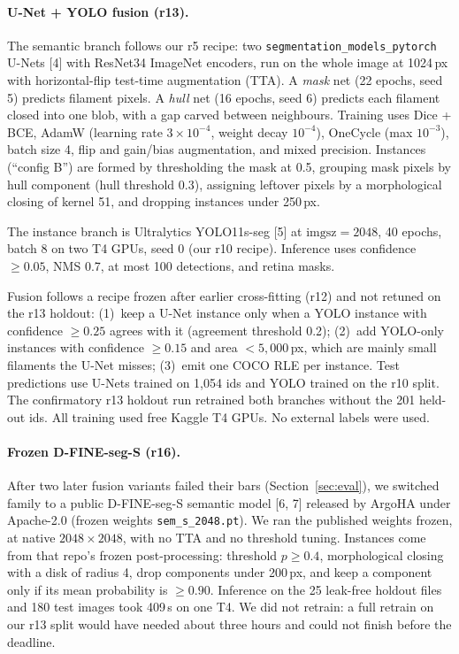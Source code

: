 \documentclass[sigconf,nonacm]{acmart}
\begin{document}
\paragraph{U-Net + YOLO fusion (r13).}
The semantic branch follows our r5 recipe: two \texttt{segmentation\_models\_pytorch} U-Nets [4] with ResNet34 ImageNet encoders, run on the whole image at 1024\,px with horizontal-flip test-time augmentation (TTA). A \emph{mask} net (22 epochs, seed 5) predicts filament pixels. A \emph{hull} net (16 epochs, seed 6) predicts each filament closed into one blob, with a gap carved between neighbours. Training uses Dice + BCE, AdamW (learning rate $3\times10^{-4}$, weight decay $10^{-4}$), OneCycle (max $10^{-3}$), batch size 4, flip and gain/bias augmentation, and mixed precision. Instances (``config B'') are formed by thresholding the mask at 0.5, grouping mask pixels by hull component (hull threshold 0.3), assigning leftover pixels by a morphological closing of kernel 51, and dropping instances under 250\,px.

The instance branch is Ultralytics YOLO11s-seg [5] at $\mathrm{imgsz}=2048$, 40 epochs, batch 8 on two T4 GPUs, seed 0 (our r10 recipe). Inference uses confidence $\geq 0.05$, NMS 0.7, at most 100 detections, and retina masks.

Fusion follows a recipe frozen after earlier cross-fitting (r12) and not retuned on the r13 holdout: (1)~keep a U-Net instance only when a YOLO instance with confidence $\geq 0.25$ agrees with it (agreement threshold 0.2); (2)~add YOLO-only instances with confidence $\geq 0.15$ and area $< 5{,}000$\,px, which are mainly small filaments the U-Net misses; (3)~emit one COCO RLE per instance. Test predictions use U-Nets trained on 1,054 ids and YOLO trained on the r10 split. The confirmatory r13 holdout run retrained both branches without the 201 held-out ids. All training used free Kaggle T4 GPUs. No external labels were used.

\paragraph{Frozen D-FINE-seg-S (r16).}
After two later fusion variants failed their bars (Section~\ref{sec:eval}), we switched family to a public D-FINE-seg-S semantic model [6, 7] released by ArgoHA under Apache-2.0 (frozen weights \texttt{sem\_s\_2048.pt}). We ran the published weights frozen, at native $2048\times2048$, with no TTA and no threshold tuning. Instances come from that repo's frozen post-processing: threshold $p\geq 0.4$, morphological closing with a disk of radius 4, drop components under 200\,px, and keep a component only if its mean probability is $\geq 0.90$. Inference on the 25 leak-free holdout files and 180 test images took 409\,s on one T4. We did not retrain: a full retrain on our r13 split would have needed about three hours and could not finish before the deadline.
\end{document}
